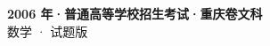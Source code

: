 \documentclass[zihao=-4, a4paper]{ctexart}
\begin{document}
\begin{center}
  {\Large\bfseries 2006 年·普通高等学校招生考试·重庆卷文科}\\[4pt]
  {\large 数学 · 试题版}
\end{center}
\medskip
{}

\end{document}
